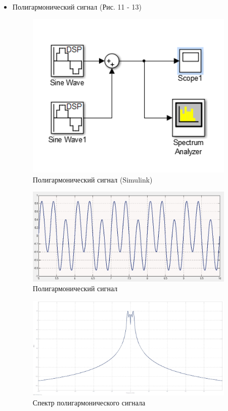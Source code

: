 \documentclass[10pt,a4paper]{article}
\begin{document}
\begin{itemize}
\item Полигармонический сигнал (Рис. 11 - 13)
\begin{figure}[h]
\centering
\includegraphics[width=10cm]{1_simulink} 
\caption{Полигармонический сигнал (Simulink)} 
\label{fig.l5_1s} 
\end{figure}
\begin{figure}[h]
\centering
\includegraphics[width=10cm]{lab5_1_simulink} 
\caption{Полигармонический сигнал} 
\label{fig.l5_2s1} 
\end{figure}
\begin{figure}[h]
\centering
\includegraphics[width=10cm]{lab5_2_simulink}
\caption{Спектр полигармонического сигнала} 
\label{fig.l5_3s} 
\end{figure}


\end{itemize}
\end{document}
